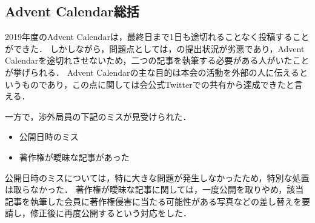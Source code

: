 \subsection*{Advent Calendar総括}


2019年度のAdvent Calendarは，最終日まで1日も途切れることなく投稿することができた．
しかしながら，問題点としては，\secondGrade{}の提出状況が劣悪であり，Advent Calendarを途切れさせないため，二つの記事を執筆する必要がある人がいたことが挙げられる．
Advent Calendarの主な目的は本会の活動を外部の人に伝えるというものであり，この点に関しては会公式Twitterでの共有から達成できたと言える．

一方で，渉外局員の下記のミスが見受けられた．
\begin{itemize}
\item 公開日時のミス
\item 著作権が曖昧な記事があった
\end{itemize}
公開日時のミスについては，特に大きな問題が発生しなかったため，特別な処置は取らなかった．
著作権が曖昧な記事に関しては，一度公開を取りやめ，該当記事を執筆した会員に著作権侵害に当たる可能性がある写真などの差し替えを要請し，修正後に再度公開するという対応をした．

